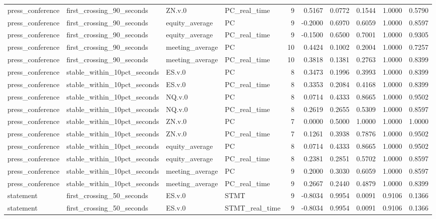 \begin{tabular}{llllrrrrrr}
press_conference & first_crossing_90_seconds & ZN.v.0 & PC_real_time & 9 & 0.5167 & 0.0772 & 0.1544 & 1.0000 & 0.5790 \\
press_conference & first_crossing_90_seconds & equity_average & PC & 9 & -0.2000 & 0.6970 & 0.6059 & 1.0000 & 0.8597 \\
press_conference & first_crossing_90_seconds & equity_average & PC_real_time & 9 & -0.1500 & 0.6500 & 0.7001 & 1.0000 & 0.9305 \\
press_conference & first_crossing_90_seconds & meeting_average & PC & 10 & 0.4424 & 0.1002 & 0.2004 & 1.0000 & 0.7257 \\
press_conference & first_crossing_90_seconds & meeting_average & PC_real_time & 10 & 0.3818 & 0.1381 & 0.2763 & 1.0000 & 0.8399 \\
press_conference & stable_within_10pct_seconds & ES.v.0 & PC & 8 & 0.3473 & 0.1996 & 0.3993 & 1.0000 & 0.8399 \\
press_conference & stable_within_10pct_seconds & ES.v.0 & PC_real_time & 8 & 0.3353 & 0.2084 & 0.4168 & 1.0000 & 0.8399 \\
press_conference & stable_within_10pct_seconds & NQ.v.0 & PC & 8 & 0.0714 & 0.4333 & 0.8665 & 1.0000 & 0.9502 \\
press_conference & stable_within_10pct_seconds & NQ.v.0 & PC_real_time & 8 & 0.2619 & 0.2655 & 0.5309 & 1.0000 & 0.8597 \\
press_conference & stable_within_10pct_seconds & ZN.v.0 & PC & 7 & 0.0000 & 0.5000 & 1.0000 & 1.0000 & 1.0000 \\
press_conference & stable_within_10pct_seconds & ZN.v.0 & PC_real_time & 7 & 0.1261 & 0.3938 & 0.7876 & 1.0000 & 0.9502 \\
press_conference & stable_within_10pct_seconds & equity_average & PC & 8 & 0.0714 & 0.4333 & 0.8665 & 1.0000 & 0.9502 \\
press_conference & stable_within_10pct_seconds & equity_average & PC_real_time & 8 & 0.2381 & 0.2851 & 0.5702 & 1.0000 & 0.8597 \\
press_conference & stable_within_10pct_seconds & meeting_average & PC & 9 & 0.2000 & 0.3030 & 0.6059 & 1.0000 & 0.8597 \\
press_conference & stable_within_10pct_seconds & meeting_average & PC_real_time & 9 & 0.2667 & 0.2440 & 0.4879 & 1.0000 & 0.8399 \\
statement & first_crossing_50_seconds & ES.v.0 & STMT & 9 & -0.8034 & 0.9954 & 0.0091 & 0.9106 & 0.1366 \\
statement & first_crossing_50_seconds & ES.v.0 & STMT_real_time & 9 & -0.8034 & 0.9954 & 0.0091 & 0.9106 & 0.1366 \\

\end{tabular}
